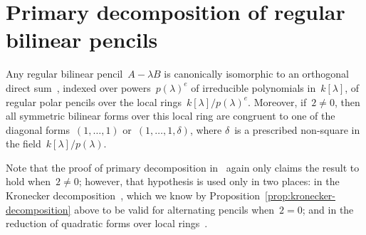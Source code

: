 \documentclass{lms}
\begin{document}
% 
% 
% 
% 
\section{Primary decomposition of regular bilinear pencils}
\label{S:bil-regular}

Any regular bilinear pencil~$A - λ B$ is canonically isomorphic to
an orthogonal direct sum~\cite[Theorem 4.2]{inventiones1976waterhouse},
indexed over powers~$p(λ)^e$ of irreducible polynomials in~$k[λ]$,
of regular polar pencils over the local rings~$k[λ]/p(λ)^e$.
Moreover, if~$2 ≠ 0$, then all symmetric bilinear forms over this local ring
are congruent to one of the diagonal forms~$(1,…,1)$ or~$(1,…,1,δ)$,
where $δ$~is a prescribed non-square in the field~$k[λ]/p(λ)$.

Note that the proof of primary decomposition
in~\cite{inventiones1976waterhouse} again
only claims the result to hold when~$2 ≠ 0$; however,
that hypothesis is used only in two places:
in the Kronecker decomposition~\cite[Theorem 3.1]{inventiones1976waterhouse},
which we know by Proposition~\ref{prop:kronecker-decomposition} above
to be valid for alternating pencils when~$2 = 0$;
and in the reduction of quadratic forms over
local rings~\cite[Proposition~1.2]{inventiones1976waterhouse}.
\end{document}
